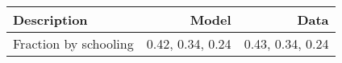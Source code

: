 \begin{tabular}{lrr}
\hline
Description & Model  & Data  \\
\hline
Fraction by schooling & 0.42, 0.34, 0.24  & 0.43, 0.34, 0.24  \\
\hline
\end{tabular}%
